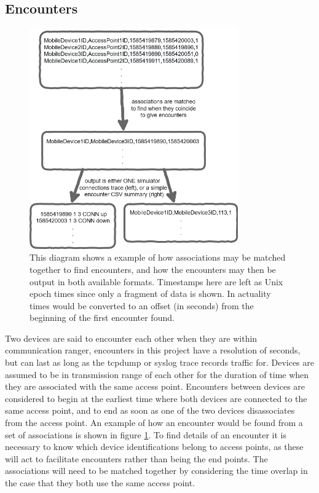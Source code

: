 \subsection{Encounters} 
\label{section:encounters}
\begin{figure}[h]
    \centerline{\includegraphics[width=0.8\textwidth]{assoc_to_enc.png}}
    \caption{This diagram shows a example of how associations may be matched together to find encounters, and how the encounters may then be output in both available formats. Timestamps here are left as Unix epoch times since only a fragment of data is shown. In actuality times would be converted to an offset (in seconds) from the beginning of the first encounter found.}
    \label{fig:assoc_to_enc}
\end{figure}
Two devices are said to encounter each other when they are within communication ranger, encounters in this project have a resolution of seconds, but can last as long as the tcpdump or syslog trace records traffic for. Devices are assumed to be in transmission range of each other for the duration of time when they are associated with the same access point. Encounters between devices are considered to begin at the earliest time where both devices are connected to the same access point, and to end as soon as one of the two devices disassociates from the access point. An example of how an encounter would be found from a set of associations is shown in figure \ref{fig:assoc_to_enc}. To find details of an encounter it is necessary to know which device identifications belong to access points, as these will act to facilitate encounters rather than being the end points. The associations will need to be matched together by considering the time overlap in the case that they both use the same access point.\\\\
